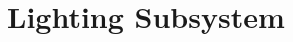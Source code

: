\documentclass[../main]{subfiles}
\begin{document}
\chapter{Lighting Subsystem} \label{chp:lightSubsystem}

%
%


%
\end{document}
